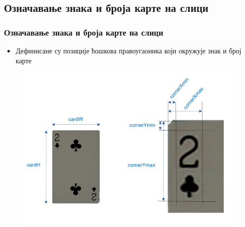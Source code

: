 \subsection{Означавање знака и броја карте на слици}
\begin{frame}
\frametitle{Означавање знака и броја карте на слици}
\begin{itemize}
 \item Дефинисане су позиције ћошкова
 правоугаоника који окружује знак и број карте
\end{itemize}
\begin{figure}[H]
  \centering
      \includegraphics[scale=0.27]{slike/measures.png}
 \end{figure}
\end{frame}

